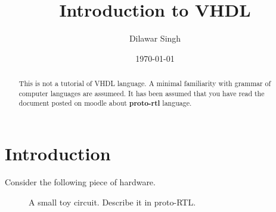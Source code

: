 \documentclass[a4paper,10pt]{article}
\title{Introduction to VHDL}
\author{Dilawar Singh}
\date{\today}
\begin{document}
\maketitle

\begin{abstract}
  
  This is not a tutorial of VHDL language. A minimal familiarity with grammar of
  computer languages are assumeed. It has been assumed that you have read the
  document posted on moodle about \textbf{proto-rtl} language.

\end{abstract}

\section{Introduction}
  
  Consider the following piece of hardware.
 
  \begin{figure}[h]
    
    \begin{center}
    \end{center}
    \caption{A small toy circuit. Describe it in proto-RTL.}
    \label{fig:circuit}
  \end{figure}
\end{document}
